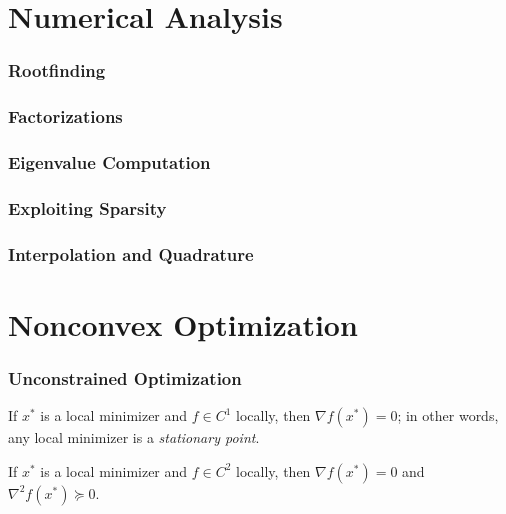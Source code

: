 \documentclass[11pt, letterpaper]{article}
\begin{document}
\tableofcontents
\newpage

\part{Numerical Analysis}

\newpage
\section{Rootfinding} 

\newpage
\section{Factorizations}

\newpage
\section{Eigenvalue Computation}

\newpage 
\section{Exploiting Sparsity} 

\newpage 
\section{Interpolation and Quadrature}

\newpage
\part{Nonconvex Optimization}

\section{Unconstrained Optimization}

\begin{concept}
    If \(x^*\) is a local minimizer and \(f \in C^1\) locally, then \(\nabla f(x^*) = 0\); in other words, any local minimizer is a \textit{stationary point}. 
\end{concept}

\begin{concept}
    If \(x^*\) is a local minimizer and \(f \in C^2\) locally, then \(\nabla f(x^*) = 0\) and \(\nabla^2 f(x^*) \succeq 0\). 
\end{concept}
\end{document}
